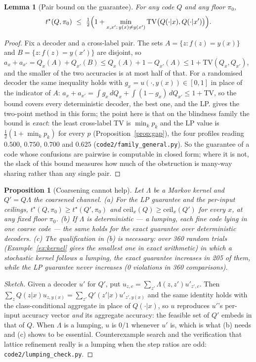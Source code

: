 \documentclass[11pt]{article}
\newtheorem{lemma}{Lemma}
\newtheorem{proposition}{Proposition}
\begin{document}
\begin{lemma}[Pair bound on the guarantee]\label{lem:pair}
For any code $Q$ and any floor $\pi_0$,
\[
t^\star(Q,\pi_0)\ \le\ \tfrac12\Bigl(1+\min_{x,x':\,y(x)\neq y(x')}
\mathrm{TV}\bigl(Q(\cdot|x),Q(\cdot|x')\bigr)\Bigr).
\]
\end{lemma}
\begin{proof}
Fix a decoder and a cross-label pair. The sets $A=\{z:f(z)=y(x)\}$ and
$B=\{z:f(z)=y(x')\}$ are disjoint, so
$a_x+a_{x'}=Q_x(A)+Q_{x'}(B)\le Q_x(A)+1-Q_{x'}(A)\le 1+\mathrm{TV}(Q_x,Q_{x'})$, and the
smaller of the two accuracies is at most half of that. For a randomised decoder the same inequality
holds with $g_x=u(\cdot,y(x))\in[0,1]$ in place of the indicator of $A$: $a_x+a_{x'}=\int
g_x\,dQ_x+\int(1-g_x)\,dQ_{x'}\le 1+\mathrm{TV}$, so the bound covers every deterministic decoder,
the best one, and the LP. \citet{raginsky2011} gives the two-point
method in this form; the point here is that on the blindness family the bound is \emph{exact}:
the least cross-label TV is $\min_k p_k$ and the LP value is $\tfrac12(1+\min_k p_k)$ for every
$p$ (Proposition~\ref{prop:gap}), the four profiles reading $0.500$, $0.750$, $0.700$ and $0.625$
(\texttt{code2/family\_general.py}). So the guarantee of a code
whose confusions are pairwise is computable in closed form; where it is not, the slack of this
bound measures how much of the obstruction is many-way sharing rather than any single pair.
\end{proof}

\begin{proposition}[Coarsening cannot help]\label{prop:coarsen}
Let $\Lambda$ be a Markov kernel and $Q'=Q\Lambda$ the coarsened channel.
\emph{(a)} For the LP guarantee and the per-input ceilings, $t^\star(Q,\pi_0)\ge
t^\star(Q',\pi_0)$ and $\mathrm{ceil}_x(Q)\ge\mathrm{ceil}_x(Q')$ for every $x$, at any fixed
floor $\pi_0$. \emph{(b)} If $\Lambda$ is deterministic --- a lumping, each fine code lying in one
coarse code --- the same holds for the \emph{exact} guarantee over deterministic decoders.
\emph{(c)} The qualification in (b) is necessary: over 360 random
trials (Example~\ref{ex:kernel} gives the smallest one in exact arithmetic) in which a stochastic
kernel follows a lumping, the exact guarantee \emph{increases} in
205 of them, while the LP guarantee never increases
(0 violations in 360 comparisons).
\end{proposition}
\begin{proof}[Sketch]
Given a decoder $u'$ for $Q'$, put $u_{z,c}=\sum_{z'}\Lambda(z,z')u'_{z',c}$. Then
$\sum_z Q(z|x)u_{z,y(x)}=\sum_{z'}Q'(z'|x)u'_{z',y(x)}$ and the same identity holds with the
class-conditional aggregate in place of $Q(\cdot|x)$, so $u$ reproduces $u'$'s per-input accuracy
vector \emph{and} its aggregate accuracy: the feasible set of $Q'$ embeds in that of $Q$. When
$\Lambda$ is a lumping, $u$ is $0/1$ whenever $u'$ is, which is what (b) needs and (c) shows to be
essential. Counterexample search and the verification that lattice refinement really is a lumping
when the step ratios are odd: \texttt{code2/lumping\_check.py}.
\end{proof}
\end{document}
